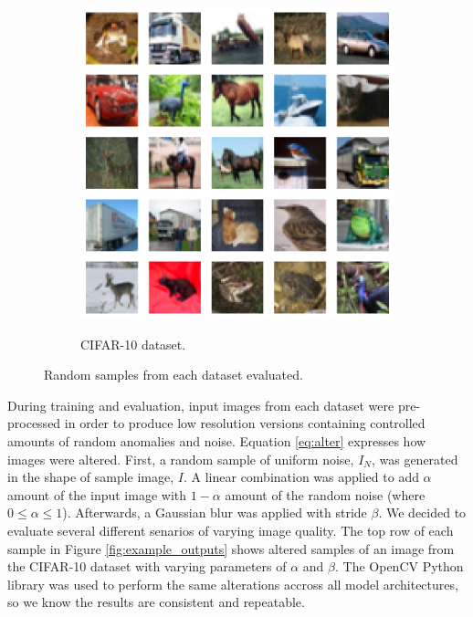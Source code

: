 \documentclass[letterpaper]{article} %
\begin{document}
\begin{figure}[h!]
\begin{subfigure}{0.22\textwidth}
\begin{center}
\begin{minipage}[t]{0.95\linewidth}
\begin{centering}
{\includegraphics[width=\linewidth]{cifar_samples.png}}
\caption{CIFAR-10 dataset.}
\label{fig:cifar_dataset}
\end{centering}
\end{minipage}
\end{center}
\end{subfigure}
\caption{Random samples from each dataset evaluated.}
\label{fig:datasets}
\end{figure}

During training and evaluation, input images from each dataset were pre-processed
in order to produce low resolution versions containing controlled amounts of random anomalies and noise.
Equation \ref{eq:alter} expresses how images were altered.
First, a random sample of uniform noise, $I_{N}$, was generated in the shape of
sample image, $I$. A linear combination was applied to add $\alpha$ amount of the input
image with $1 - \alpha$ amount of the random noise
(where $0 \leq \alpha \leq 1$).
Afterwards, a Gaussian blur was applied with stride $\beta$.
We decided to evaluate several different senarios of varying image quality.
The top row of each sample in Figure \ref{fig:example_outputs} shows altered samples
of an image from the CIFAR-10 dataset with varying parameters of $\alpha$ and $\beta$.
The OpenCV Python library was used to perform the same alterations accross all model architectures,
so we know the results are consistent and repeatable.
\end{document}
